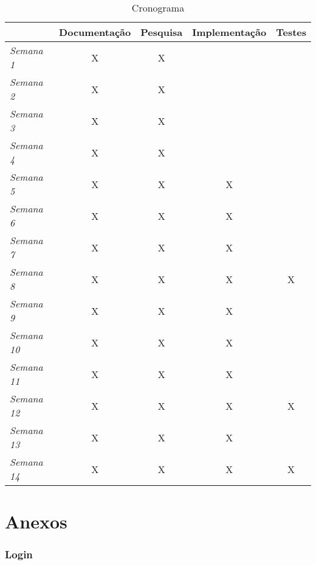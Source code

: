 \documentclass[12pt,oneside,a4paper,article]{abntex2}
\begin{document}
	\begin{table}[]
		\centering
		\begin{tabular}{|l|c|c|c|c|}
		\hline
		& \multicolumn{1}{l|}{\textbf{Documentação}} & \multicolumn{1}{l|}{\textbf{Pesquisa}} & \multicolumn{1}{l|}{\textbf{Implementação}} & \multicolumn{1}{l|}{\textbf{Testes}} \\ \hline
		\textit{Semana 1} 
		 & X & X& \multicolumn{1}{l|}{} &\multicolumn{1}{l|}{}                  \\ \hline
			\textit{Semana 2}  & X & X &   &   \\ \hline
			\textit{Semana 3}  & X & X &   &   \\ \hline
			\textit{Semana 4}  & X & X &   &   \\ \hline
			\textit{Semana 5}  & X & X & X &   \\ \hline
			\textit{Semana 6}  & X & X & X &   \\ \hline
			\textit{Semana 7}  & X & X & X &   \\ \hline
			\textit{Semana 8}  & X & X & X & X \\ \hline
			\textit{Semana 9}  & X & X & X &   \\ \hline
			\textit{Semana 10} & X & X & X &   \\ \hline
			\textit{Semana 11} & X & X & X &   \\ \hline
			\textit{Semana 12} & X & X & X & X \\ \hline
			\textit{Semana 13} & X & X & X &   \\ \hline
			\textit{Semana 14} & X & X & X & X \\ \hline
		\end{tabular}
	\caption{Cronograma}
	\label{cronograma}
	
\end{table}

\part*{Anexos}
\appendix
	\section{Login}
		\begin{mdframed}[linecolor=black, topline=true, bottomline=true,leftline=false, rightline=false, backgroundcolor=white,userdefinedwidth=\textwidth]
			\inputminted[linenos=true,numberblanklines=true,showspaces=false,breaklines=true]{html}{Codigos/login.html}
		\end{mdframed}
		
\end{document}
